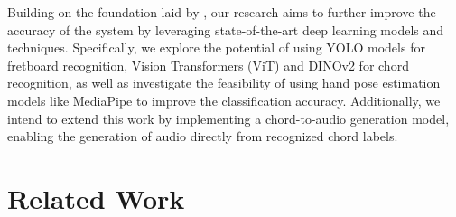 \documentclass[10pt,twocolumn,letterpaper]{article}
\begin{document}
Building on the foundation laid by \cite{Kristian_Zaman_Tenoyo_Jodhinata_2024}, our research aims to further improve the accuracy of the system by leveraging state-of-the-art deep learning models and techniques. Specifically, we explore the potential of using YOLO models for fretboard recognition, Vision Transformers (ViT) \cite{dosovitskiy2020image} and DINOv2 \cite{oquab2023dinov2} for chord recognition, as well as investigate the feasibility of using hand pose estimation models like MediaPipe \cite{zhang2020mediapipe} to improve the classification accuracy. Additionally, we intend to extend this work by implementing a chord-to-audio generation model, enabling the generation of audio directly from recognized chord labels.

\section{Related Work}  



\end{document}
